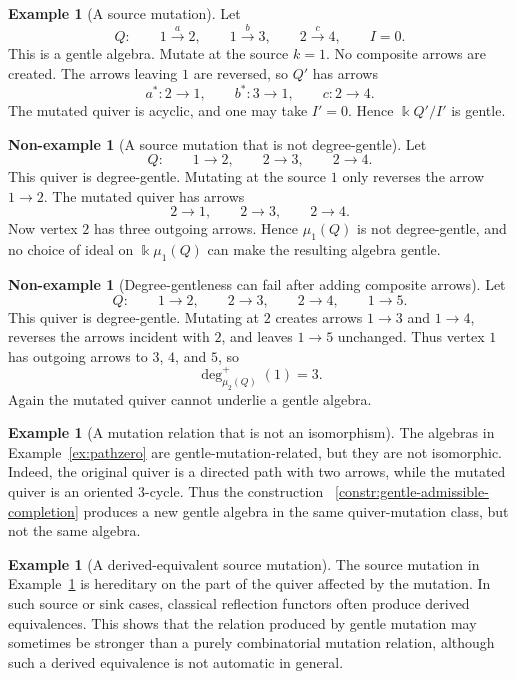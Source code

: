 \documentclass[11pt]{article}
\newcommand{\K}{\Bbbk}
\theoremstyle{plain}
\theoremstyle{definition}
\newtheorem{example}[theorem]{Example}
\newtheorem{nonexample}[theorem]{Non-example}
\theoremstyle{remark}
\begin{document}
\begin{example}[A source mutation]
\label{ex:source-mutation}
Let
\[
  Q:
  \qquad
  1\xrightarrow{a}2,
  \qquad
  1\xrightarrow{b}3,
  \qquad
  2\xrightarrow{c}4,
  \qquad
  I=0.
\]
This is a gentle algebra.  Mutate at the source \(k=1\).  No composite arrows
are created.  The arrows leaving \(1\) are reversed, so \(Q'\) has arrows
\[
  a^*:2\to 1,
  \qquad
  b^*:3\to 1,
  \qquad
  c:2\to 4.
\]
The mutated quiver is acyclic, and one may take \(I'=0\).  Hence
\(\K Q'/I'\) is gentle.
\end{example}

\begin{nonexample}[A source mutation that is not degree-gentle]
\label{nonex:source-not-degree-gentle}
Let
\[
  Q:
  \qquad
  1\to 2,
  \qquad
  2\to 3,
  \qquad
  2\to 4.
\]
This quiver is degree-gentle.  Mutating at the source \(1\) only reverses the
arrow \(1\to 2\).  The mutated quiver has arrows
\[
  2\to 1,
  \qquad
  2\to 3,
  \qquad
  2\to 4.
\]
Now vertex \(2\) has three outgoing arrows.  Hence \(\mu_1(Q)\) is not
degree-gentle, and no choice of ideal on \(\K\mu_1(Q)\) can make the resulting
algebra gentle.
\end{nonexample}

\begin{nonexample}[Degree-gentleness can fail after adding composite arrows]
\label{nonex:composite-degree-failure}
Let
\[
  Q:
  \qquad
  1\to 2,
  \qquad
  2\to 3,
  \qquad
  2\to 4,
  \qquad
  1\to 5.
\]
This quiver is degree-gentle.  Mutating at \(2\) creates arrows \(1\to 3\) and
\(1\to 4\), reverses the arrows incident with \(2\), and leaves \(1\to 5\)
unchanged.  Thus vertex \(1\) has outgoing arrows to \(3\), \(4\), and \(5\),
so
\[
  \deg^+_{\mu_2(Q)}(1)=3.
\]
Again the mutated quiver cannot underlie a gentle algebra.
\end{nonexample}

\begin{example}[A mutation relation that is not an isomorphism]
The algebras in Example~\ref{ex:pathzero} are gentle-mutation-related, but
they are not isomorphic.  Indeed, the original quiver is a directed path with
two arrows, while the mutated quiver is an oriented 3-cycle.  Thus the
construction ~\ref{constr:gentle-admissible-completion} produces a new gentle algebra in the same quiver-mutation class,
but not the same algebra.
\end{example}

\begin{example}[A derived-equivalent source mutation]
The source mutation in Example~\ref{ex:source-mutation} is hereditary on the
part of the quiver affected by the mutation.  In such source or sink cases,
classical reflection functors often produce derived equivalences.  This shows
that the relation produced by gentle mutation may sometimes be stronger than a
purely combinatorial mutation relation, although such a derived equivalence is
not automatic in general.
\end{example}
\end{document}
